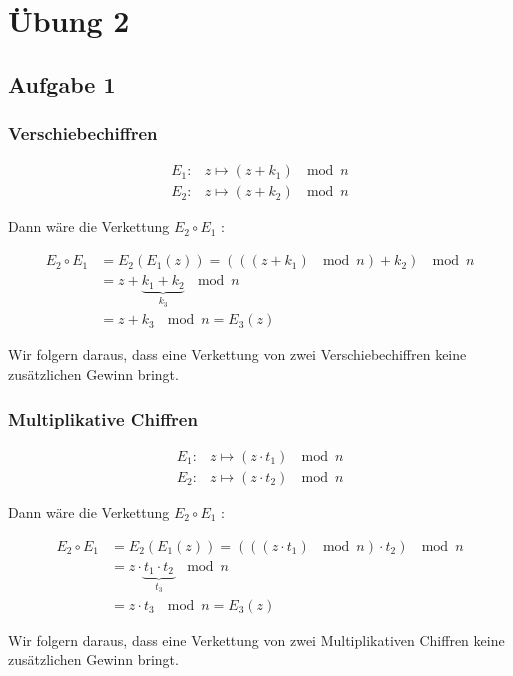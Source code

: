 \section{Übung 2}

\subsection{Aufgabe 1}

\subsubsection{Verschiebechiffren}

\begin{align}
	E_1: & z \mapsto (z +k_1)~\mod n \\
	E_2: & z \mapsto (z +k_2)~\mod n 
\end{align}

Dann wäre die Verkettung $ E_2 \circ E_1 $ :

\begin{align}
	E_2 \circ E_1 & = E_2(E_1(z)) =  (((z +k_1)~\mod n) +k_2)~\mod n \\
	              & = z+\underbrace{k_1+k_2}_{k_3} ~\mod n \\
	              & = z+k_3 ~\mod n = E_3(z)
\end{align}

Wir folgern daraus, dass eine Verkettung von zwei Verschiebechiffren keine zusätzlichen Gewinn bringt.

\subsubsection{Multiplikative Chiffren}

\begin{align}
	E_1: & z \mapsto (z \cdot  t_1)~\mod n \\
	E_2: & z \mapsto (z \cdot  t_2)~\mod n 
\end{align}

Dann wäre die Verkettung $ E_2 \circ E_1 $ :

\begin{align}
	E_2 \circ E_1 & = E_2(E_1(z)) =  (((z  \cdot t_1)~\mod n)  \cdot t_2)~\mod n \\
	              & = z \cdot \underbrace{t_1 \cdot t_2}_{t_3} ~\mod n \\
	              & = z \cdot t_3 ~\mod n = E_3(z)
\end{align}

Wir folgern daraus, dass eine Verkettung von zwei Multiplikativen Chiffren keine zusätzlichen Gewinn bringt.


